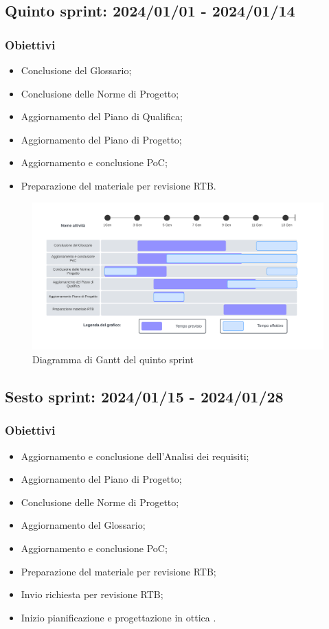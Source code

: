 \subsection{Quinto sprint: 2024/01/01 - 2024/01/14}
\subsubsection{Obiettivi}
\begin{itemize}[itemsep=-2pt]
    \item Conclusione del Glossario;
    \item Conclusione delle Norme di Progetto;
    \item Aggiornamento del Piano di Qualifica;
    \item Aggiornamento del Piano di Progetto;
    \item Aggiornamento e conclusione PoC;
    \item Preparazione del materiale per revisione RTB.
\end{itemize}

\begin{figure}[h!]
    \centering  
    \includegraphics[width=\textwidth]{Roadmap5sprint.png}
    \caption{Diagramma di Gantt del quinto sprint}
    \label{fig:roadmap5s}
\end{figure}
\newpage

\subsection{Sesto sprint: 2024/01/15 - 2024/01/28}
\subsubsection{Obiettivi}
\begin{itemize}[itemsep=-2pt]
    \item Aggiornamento e conclusione dell'Analisi dei requisiti;
    \item Aggiornamento del Piano di Progetto;
    \item Conclusione delle Norme di Progetto;
    \item Aggiornamento del Glossario;
    \item Aggiornamento e conclusione PoC;
    \item Preparazione del materiale per revisione RTB;
    \item Invio richiesta per revisione RTB;
    \item Inizio pianificazione e progettazione in ottica .
\end{itemize}

